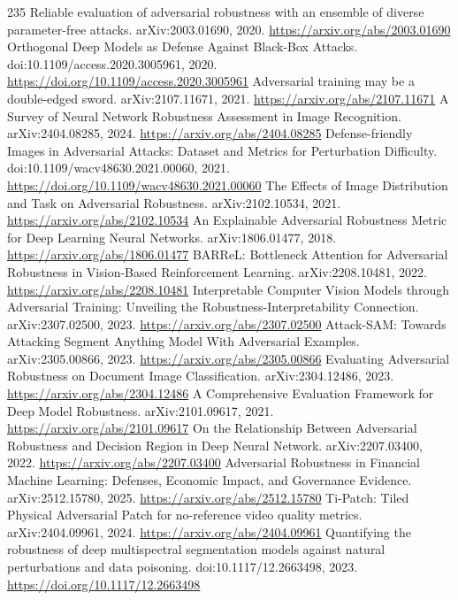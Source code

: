 \documentclass[11pt]{article}
\begin{document}
\begin{thebibliography}{235}
 Reliable evaluation of adversarial robustness with an ensemble of diverse parameter-free attacks. arXiv:2003.01690, 2020. \url{https://arxiv.org/abs/2003.01690}
 Orthogonal Deep Models as Defense Against Black-Box Attacks. doi:10.1109/access.2020.3005961, 2020. \url{https://doi.org/10.1109/access.2020.3005961}
 Adversarial training may be a double-edged sword. arXiv:2107.11671, 2021. \url{https://arxiv.org/abs/2107.11671}
 A Survey of Neural Network Robustness Assessment in Image Recognition. arXiv:2404.08285, 2024. \url{https://arxiv.org/abs/2404.08285}
 Defense-friendly Images in Adversarial Attacks: Dataset and Metrics for Perturbation Difficulty. doi:10.1109/wacv48630.2021.00060, 2021. \url{https://doi.org/10.1109/wacv48630.2021.00060}
 The Effects of Image Distribution and Task on Adversarial Robustness. arXiv:2102.10534, 2021. \url{https://arxiv.org/abs/2102.10534}
 An Explainable Adversarial Robustness Metric for Deep Learning Neural Networks. arXiv:1806.01477, 2018. \url{https://arxiv.org/abs/1806.01477}
 BARReL: Bottleneck Attention for Adversarial Robustness in Vision-Based Reinforcement Learning. arXiv:2208.10481, 2022. \url{https://arxiv.org/abs/2208.10481}
 Interpretable Computer Vision Models through Adversarial Training: Unveiling the Robustness-Interpretability Connection. arXiv:2307.02500, 2023. \url{https://arxiv.org/abs/2307.02500}
 Attack-SAM: Towards Attacking Segment Anything Model With Adversarial Examples. arXiv:2305.00866, 2023. \url{https://arxiv.org/abs/2305.00866}
 Evaluating Adversarial Robustness on Document Image Classification. arXiv:2304.12486, 2023. \url{https://arxiv.org/abs/2304.12486}
 A Comprehensive Evaluation Framework for Deep Model Robustness. arXiv:2101.09617, 2021. \url{https://arxiv.org/abs/2101.09617}
 On the Relationship Between Adversarial Robustness and Decision Region in Deep Neural Network. arXiv:2207.03400, 2022. \url{https://arxiv.org/abs/2207.03400}
 Adversarial Robustness in Financial Machine Learning: Defenses, Economic Impact, and Governance Evidence. arXiv:2512.15780, 2025. \url{https://arxiv.org/abs/2512.15780}
 Ti-Patch: Tiled Physical Adversarial Patch for no-reference video quality metrics. arXiv:2404.09961, 2024. \url{https://arxiv.org/abs/2404.09961}
 Quantifying the robustness of deep multispectral segmentation models against natural perturbations and data poisoning. doi:10.1117/12.2663498, 2023. \url{https://doi.org/10.1117/12.2663498}

\end{thebibliography}
\end{document}
